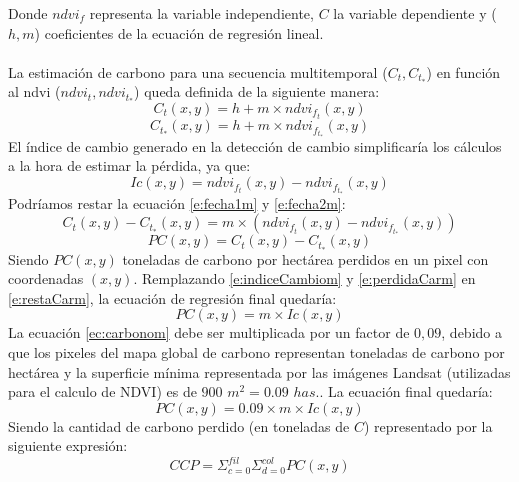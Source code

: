 Donde $ ndvi_{f} $ representa la variable independiente, $ C $ la variable dependiente y ($ h , m $) coeficientes de la ecuaci\'on de regresi\'on lineal. \\~\\
La estimaci\'on de carbono para una secuencia multitemporal ($ C_{t},C_{t_{*}} $) en funci\'on al ndvi ($ ndvi_{t},ndvi_{t_{*}} $) queda definida de la siguiente manera:
\begin{equation}
\label{e:fecha1m}
C_{t}(x,y)=h+m \times ndvi_{f_{t}}(x,y)
\end{equation}
\begin{equation}
\label{e:fecha2m}
C_{t_{*}}(x,y)=h+m \times ndvi_{f_{t_{*}}}(x,y)
\end{equation}
 El \'indice de cambio generado en la detecci\'on de cambio simplificar\'ia los c\'alculos a la hora de estimar la p\'erdida, ya que:
 \begin{equation}
 \label{e:indiceCambiom}
 Ic(x,y)=ndvi_{f_{t}}(x,y) - ndvi_{f_{t_{*}}}(x,y)
 \end{equation}		
 Podr\'iamos restar la ecuaci\'on \ref{e:fecha1m} y \ref{e:fecha2m}:
 \begin{equation}
 \label{e:restaCarm}
C_{t}(x,y) - C_{t_{*}}(x,y)= m \times (ndvi_{f_{t}}(x,y) - ndvi_{f_{t_{*}}}(x,y))
 \end{equation}		
 \begin{equation}
 \label{e:perdidaCarm}
 PC(x,y)= C_{t}(x,y) - C_{t_{*}}(x,y)
 \end{equation}		
 Siendo $ PC(x,y)$ toneladas de carbono por hect\'area perdidos en un pixel con coordenadas $ (x,y) $. Remplazando \ref{e:indiceCambiom} y \ref{e:perdidaCarm} en \ref{e:restaCarm}, la ecuaci\'on de regresi\'on final quedar\'ia:
 \begin{equation}\label{ec:carbonom}
 PC(x,y) = m \times Ic(x,y)
 \end{equation}
 La ecuaci\'on \ref{ec:carbonom} debe ser multiplicada por un factor de $ 0,09 $, debido a que los pixeles del mapa global de carbono representan toneladas de carbono por hect\'area \cite{saatchi2011benchmark} y la superficie m\'inima representada por las im\'agenes Landsat (utilizadas para el calculo de NDVI) es de $ 900$  $m^{2}=0.09 $  $has. $. La ecuaci\'on final quedar\'ia:
 \begin{equation}\label{ec:carbonoFinalm}
 PC(x,y) = 0.09 \times m \times Ic(x,y)
 \end{equation}
 Siendo la cantidad de carbono perdido (en toneladas de $ C $) representado por la siguiente expresi\'on:
 \begin{equation}\label{ec:carbonoFinalsumatoriam}
 CCP = \Sigma_{c=0}^{fil}\Sigma_{d=0}^{col} PC(x,y)
 \end{equation}
  

